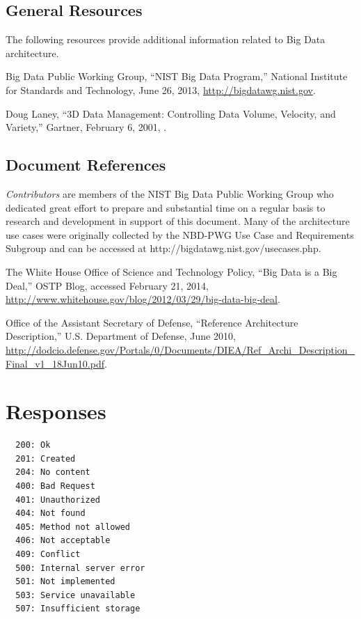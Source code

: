 \documentclass[11pt]{article}
\newcommand{\TODO}[1]{\todo[color=red!10]{#1}}
\begin{document}
\subsection{General Resources}

The following resources provide additional information related to Big Data architecture. 

Big Data Public Working Group, “NIST Big Data Program,” National Institute for Standards and 
Technology, June 26, 2013, \url{http://bigdatawg.nist.gov}.

Doug Laney, “3D Data Management: Controlling Data Volume, Velocity, and Variety,” Gartner, February 
6, 2001, \cite{laney013ddata}.

\TODO{integrate section refs}

\subsection{Document References}

 {\it Contributors} are members of the NIST Big Data Public Working Group who dedicated great effort to prepare 
and substantial time on a regular basis to research and development in support of this document.
  Many of the architecture use cases were originally collected by the NBD-PWG Use Case and Requirements 
Subgroup and can be accessed at http://bigdatawg.nist.gov/usecases.php.

The White House Office of Science and Technology Policy, “Big Data is a Big Deal,” OSTP Blog, accessed 
February 21, 2014, \url{http://www.whitehouse.gov/blog/2012/03/29/big-data-big-deal}.
 
Office of the Assistant Secretary of Defense, “Reference Architecture Description,” U.S. Department of Defense, 
June 2010, \url{http://dodcio.defense.gov/Portals/0/Documents/DIEA/Ref_Archi_Description_Final_v1_18Jun10.pdf}.





\appendix

\section{Responses}

\begin{verbatim}
  200: Ok
  201: Created
  204: No content
  400: Bad Request
  401: Unauthorized
  404: Not found
  405: Method not allowed
  406: Not acceptable
  409: Conflict
  500: Internal server error
  501: Not implemented
  503: Service unavailable
  507: Insufficient storage
\end{verbatim}
\end{document}
